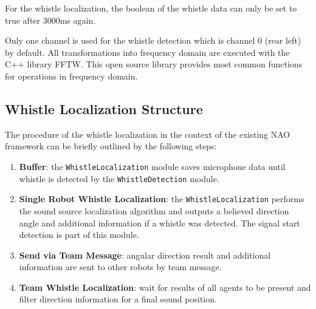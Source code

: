 For the whistle localization, the boolean of the whistle data can only be set to true
after 3000\si{\milli\second} again. 

Only one channel is used for the whistle detection which is channel 0
(rear left) by default.
All transformations into frequency domain are executed with the C++ library
\ac{FFTW}.
This open source library provides most common functions for operations
in frequency domain.

\subsection{Whistle Localization Structure}
\label{subsec:03_whistleLocalizationStructure}

The procedure of the whistle localization in the context of the existing
NAO framework can be briefly outlined by the following steps:
\begin{enumerate}
      \item \textbf{Buffer}: the \lstinline!WhistleLocalization! module saves microphone
            data until whistle is detected by the \lstinline!WhistleDetection! module.
      \item \textbf{Single Robot Whistle Localization}: the \lstinline!WhistleLocalization!
            performs the sound source localization algorithm and outputs a
            believed direction angle and additional information if a whistle was detected.
            The signal start detection is part of this module.
      \item \textbf{Send via Team Message}: angular direction result and additional information
            are sent to other robots by team message.
      \item \textbf{Team Whistle Localization}: wait for results of all agents to be present
            and filter direction information for a final sound position.
\end{enumerate}
